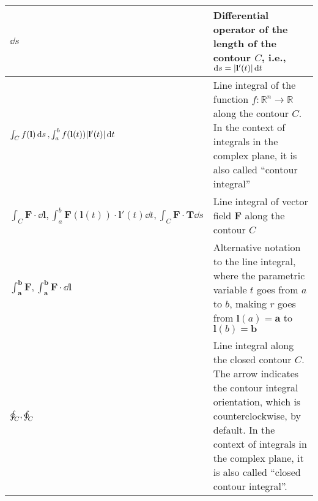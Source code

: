 \documentclass{article}
\begin{document}
\begin{xltabular}{\textwidth}{XX}
	\(\dd{s}\)                                                                                                                                                                                                                                 & Differential operator of the length of the contour \(C\), i.e., \(\dd{s} = \abs{\mathbf{l}'(t)} \dd{t}\) \cite{stewartCalculus2011}                                                                                                                     \\ \hline
	\(\int_C f(\mathbf{l}) \dd{s}, \int_a^b f(\mathbf{l}(t)) \abs{\mathbf{l}'(t)} \dd{t}\)                                                                                                                                                     & Line integral of the function \(f: \mathbb{R}^{n} \rightarrow \mathbb{R}\) along the contour \(C\). In the context of integrals in the complex plane, it is also called ``contour integral'' \cite{apostolCalculus2ndEdn1967,stewartCalculus2011}                                                                                                 \\ \hline
	\(\int_C \mathbf{F}\cdot\dd{\mathbf{l}}, \int_a^b \mathbf{F}(\mathbf{l}(t)) \cdot \mathbf{l}'(t) \dd{t}, \int_C \mathbf{F}\cdot\mathbf{T} \dd{s}\)                                                                                         & Line integral of vector field \(\mathbf{F}\) along the contour \(C\)  \cite{apostolCalculus2ndEdn1967,stewartCalculus2011}                                                                                                                              \\ \hline
	\(\int_\mathbf{a}^\mathbf{b} \mathbf{F}, \int_\mathbf{a}^\mathbf{b} \mathbf{F}\cdot\dd{\mathbf{l}}\)                                                                                                                                       & Alternative notation to the line integral, where the parametric variable \(t\) goes from \(a\) to \(b\), making \(r\) goes from \(\mathbf{l}(a) = \mathbf{a}\) to \(\mathbf{l}(b) = \mathbf{b}\) \cite{apostolCalculus2ndEdn1967}                       \\ \hline
	\(\oint_C, \varointctrclockwise_C\)                                                                                                                                                                                                        & Line integral along the closed contour \(C\). The arrow indicates the contour integral orientation, which is counterclockwise, by default. In the context of integrals in the complex plane, it is also called ``closed contour integral''.                                                                                                              \\ \hline

\end{xltabular}
\end{document}
